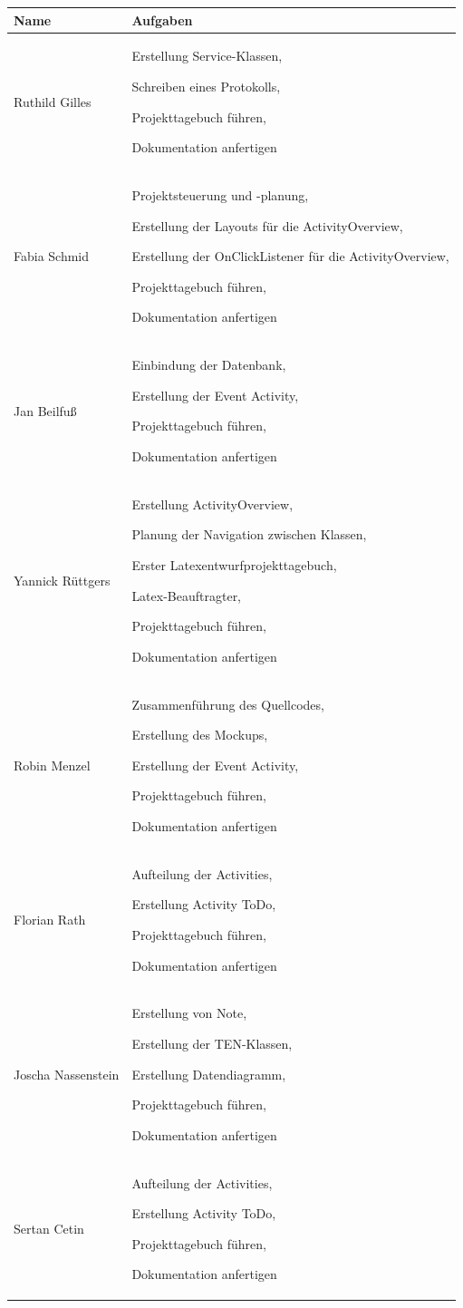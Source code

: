 \begin{longtable}{|p{4cm}|p{10cm}|}
\hline
{\textbf{Name}} & {\textbf{Aufgaben}}  \\ \hline
Ruthild Gilles & Erstellung Service-Klassen,

Schreiben eines Protokolls,

Projekttagebuch führen, 

Dokumentation anfertigen \\ \hline 
Fabia Schmid  & Projektsteuerung und -planung, 

Erstellung der Layouts für die ActivityOverview,  

Erstellung der OnClickListener für die ActivityOverview,  

Projekttagebuch führen, 

Dokumentation anfertigen \\ \hline

Jan Beilfuß & Einbindung der Datenbank, 

Erstellung der Event Activity,

Projekttagebuch führen, 

Dokumentation anfertigen \\ \hline
Yannick Rüttgers & Erstellung ActivityOverview,  

Planung der Navigation zwischen Klassen, 

Erster Latexentwurfprojekttagebuch, 

Latex-Beauftragter, 

Projekttagebuch führen, 

Dokumentation anfertigen \\ \hline
Robin Menzel & Zusammenführung des Quellcodes, 

Erstellung des Mockups, 

Erstellung der Event Activity, 

Projekttagebuch führen, 

Dokumentation anfertigen \\ \hline
Florian Rath  & Aufteilung der Activities, 

Erstellung Activity ToDo, 

Projekttagebuch führen, 

Dokumentation anfertigen \\ \hline
Joscha Nassenstein & Erstellung von Note, 

Erstellung der TEN-Klassen,  

Erstellung Datendiagramm, 

Projekttagebuch führen, 

Dokumentation anfertigen \\ \hline
Sertan Cetin &  Aufteilung der Activities, 

Erstellung Activity ToDo, 

Projekttagebuch führen, 

Dokumentation anfertigen \\ \hline
\end{longtable}

